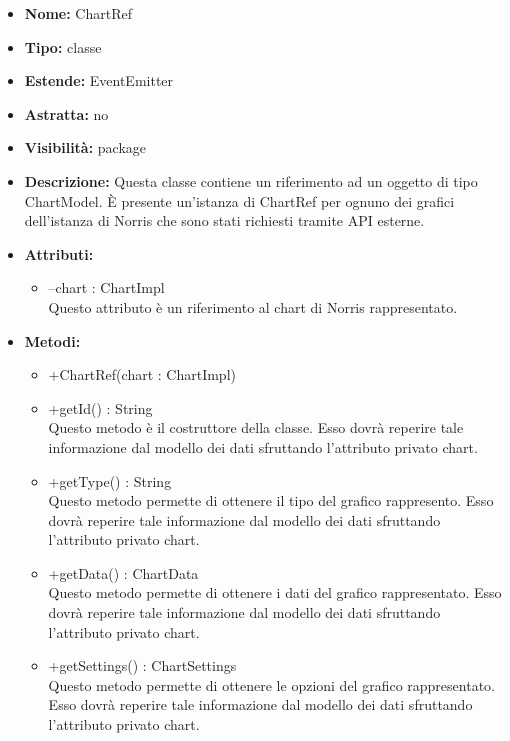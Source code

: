 			
			\begin{itemize}
			\item \textbf{Nome:} ChartRef
			\item \textbf{Tipo:} classe
			
		\item \textbf{Estende:}
		EventEmitter
		\item \textbf{Astratta:}
		no
			\item \textbf{Visibilità:} package
			\item \textbf{Descrizione:} Questa classe contiene un riferimento ad un oggetto di tipo ChartModel. È presente un'istanza di ChartRef per ognuno dei grafici dell'istanza di Norris che sono stati richiesti tramite API esterne.
			\item \textbf{Attributi:}
				\begin{itemize}
				\setlength{\itemsep}{5pt}
				
					\item[\ding{111}] {--chart : ChartImpl} \\ [1mm] Questo attributo è un riferimento al chart di Norris rappresentato.
				\end{itemize}
		
			\item \textbf{Metodi:}
				\begin{itemize}
				\setlength{\itemsep}{5pt}
				
					\item[\ding{111}] {{+ChartRef(chart : ChartImpl)}}
					\item[\ding{111}] {{+getId() : String}} \\ [1mm] Questo metodo è il costruttore della classe. Esso dovrà reperire tale informazione dal modello dei dati sfruttando l'attributo privato chart.
					\item[\ding{111}] {{+getType() : String}} \\ [1mm] Questo metodo permette di ottenere il tipo del grafico rappresento. Esso dovrà reperire tale informazione dal modello dei dati sfruttando l'attributo privato chart.
					\item[\ding{111}] {{+getData() : ChartData}} \\ [1mm] Questo metodo permette di ottenere i dati del grafico rappresentato. Esso dovrà reperire tale informazione dal modello dei dati sfruttando l'attributo privato chart.
					\item[\ding{111}] {{+getSettings() : ChartSettings}} \\ [1mm] Questo metodo permette di ottenere le opzioni del grafico rappresentato. Esso dovrà reperire tale informazione dal modello dei dati sfruttando l'attributo privato chart.
				\end{itemize}
		
			\end{itemize}

